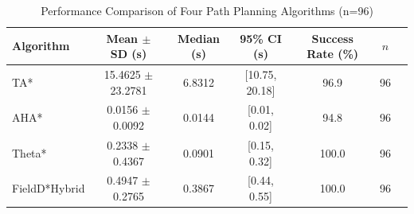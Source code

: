 \begin{table}[htbp]
\centering
\caption{Performance Comparison of Four Path Planning Algorithms (n=96)}
\label{tab:algorithm_comparison}
\begin{tabular}{lcccccc}
\hline
Algorithm & Mean $\pm$ SD (s) & Median (s) & 95\% CI (s) & Success Rate (\%) & $n$ \\
\hline
TA* & 15.4625 $\pm$ 23.2781 & 6.8312 & [10.75, 20.18] & 96.9 & 96 \\
AHA* & 0.0156 $\pm$ 0.0092 & 0.0144 & [0.01, 0.02] & 94.8 & 96 \\
Theta* & 0.2338 $\pm$ 0.4367 & 0.0901 & [0.15, 0.32] & 100.0 & 96 \\
FieldD*Hybrid & 0.4947 $\pm$ 0.2765 & 0.3867 & [0.44, 0.55] & 100.0 & 96 \\
\hline
\end{tabular}
\end{table}